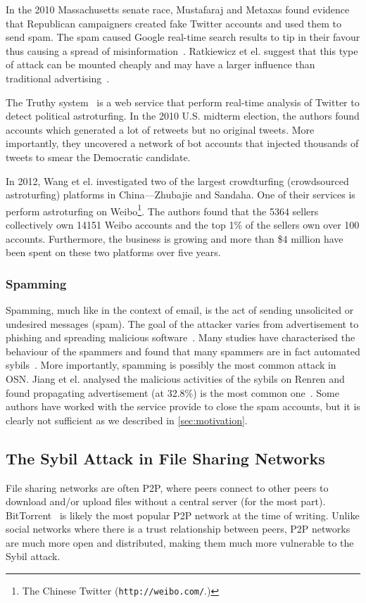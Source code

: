 In the 2010 Massachusetts senate race, Mustafaraj and Metaxas found evidence
that Republican campaigners created fake Twitter accounts and used them to send
spam. The spam caused Google real-time search results to tip in their favour
thus causing a spread of misinformation~\cite{mustafaraj2010obscurity}.
Ratkiewicz et el. suggest that this type of attack can be mounted cheaply and
may have a larger influence than traditional
advertising~\cite{ratkiewicz2011truthy}.

The Truthy system~\cite{ratkiewicz2011truthy} is a web service that perform
real-time analysis of Twitter to detect political astroturfing. In the 2010
U.S. midterm election, the authors found accounts which generated a lot of
retweets but no original tweets. More importantly, they uncovered a network of
bot accounts that injected thousands of tweets to smear the Democratic candidate.

In 2012, Wang et el. investigated two of the largest crowdturfing (crowdsourced
astroturfing) platforms in China---Zhubajie and Sandaha. One of their services
is perform astroturfing on Weibo\footnote{The Chinese Twitter
  (\texttt{http://weibo.com/}.)}. The authors found that the 5364 sellers
collectively own 14151 Weibo accounts and the top 1\% of the sellers own over
100 accounts. Furthermore, the business is growing and more than \$4 million
have been spent on these two platforms over five years\cite{wang2012serf}.

\subsubsection{Spamming}
Spamming, much like in the context of email, is the act of sending unsolicited
or undesired messages (spam). The goal of the attacker varies from advertisement
to phishing and spreading malicious software~\cite{twittermalware1,
  twittermalware2}. Many studies have characterised the behaviour of the
spammers and found that many spammers are in fact automated
sybils~\cite{stringhini2010detecting, yang2012analyzing, grier2010spam,
  jiang2015understanding}. More importantly, spamming is possibly the most
common attack in OSN. Jiang et el. analysed the malicious activities of the
sybils on Renren and found propagating advertisement (at 32.8\%) is the most
common one~\cite{jiang2015understanding}. Some authors have worked with the
service provide to close the spam accounts, but it is clearly not sufficient as
we described in \autoref{sec:motivation}.


\subsection{The Sybil Attack in File Sharing Networks}
File sharing networks are often P2P, where peers connect to other peers to
download and/or upload files without a central server (for the most part).
BitTorrent~\cite{bep3} is likely the most popular P2P network at the time of
writing. Unlike social networks where there is a trust relationship between
peers, P2P networks are much more open and distributed, making them much more
vulnerable to the Sybil attack.

